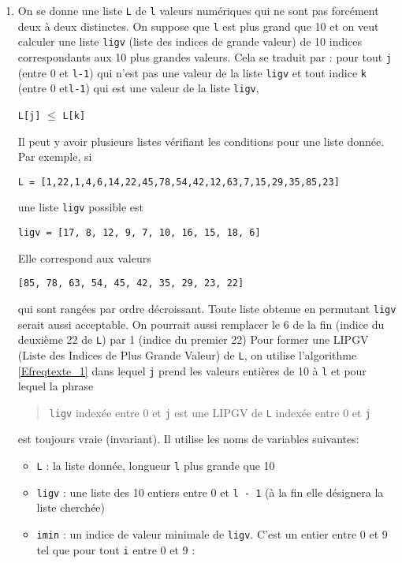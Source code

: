 \begin{enumerate}
  \item On se donne une liste \texttt{L} de \texttt{l} valeurs numériques qui ne sont pas forcément deux à deux distinctes. On suppose que \texttt{l} est plus grand que 10 et on veut calculer une liste \texttt{ligv} (liste des indices de grande valeur) de 10 indices correspondants aux 10 plus grandes valeurs. \newline
  Cela se traduit par : pour tout \texttt{j} (entre 0 et \texttt{l-1}) qui n'est pas une valeur de la liste \texttt{ligv} et tout indice \texttt{k} (entre 0 et\texttt{l-1}) qui est une valeur de la liste \texttt{ligv}, 
  \begin{center}
    \texttt{L[j]} $\leq$ \texttt{L[k]} 
  \end{center}
Il peut y avoir plusieurs listes vérifiant les conditions pour une liste donnée. Par exemple, si
\begin{center}
  \verb|L = [1,22,1,4,6,14,22,45,78,54,42,12,63,7,15,29,35,85,23]|  
\end{center}
une liste \texttt{ligv} possible est
\begin{center}
  \verb|ligv = [17, 8, 12, 9, 7, 10, 16, 15, 18, 6]|
\end{center}
Elle correspond aux valeurs
\begin{center}
\verb|[85, 78, 63, 54, 45, 42, 35, 29, 23, 22]|  
\end{center}
qui sont rangées par ordre décroissant.\newline
Toute liste obtenue en permutant \texttt{ligv} serait aussi acceptable. On pourrait aussi remplacer le 6 de la fin (indice du deuxième 22 de \texttt{L}) par 1 (indice du premier 22)\newline  
Pour former une LIPGV (Liste des Indices de Plus Grande Valeur) de \texttt{L}, on utilise l'algorithme \ref{Efreqtexte_1} dans lequel \texttt{j} prend les valeurs entières de 10 à \texttt{l} et pour lequel la phrase
\begin{quote}
 \texttt{ligv} indexée entre 0 et \texttt{j} est une LIPGV de \texttt{L} indexée entre 0 et \texttt{j}
\end{quote}
est toujours vraie (invariant). Il utilise les noms de variables suivantes:
\begin{itemize}
  \item \texttt{L} : la liste donnée, longueur \texttt{l} plus grande que 10
  \item \texttt{ligv} : une liste des 10 entiers entre 0 et \texttt{l - 1} (à la fin elle désignera la liste cherchée)  
  \item \texttt{imin} : un indice de valeur minimale de \texttt{ligv}. C'est un entier entre 0 et 9 tel que pour tout \texttt{i} entre 0 et 9 :

\end{itemize}
\end{enumerate}
